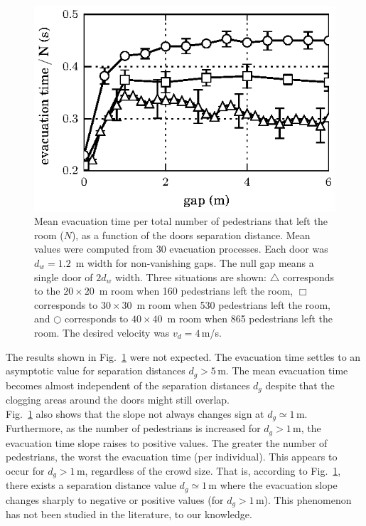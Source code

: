 \begin{figure}
\includegraphics[width=\columnwidth]{./fig9.eps}
\caption{\label{fig:1} Mean evacuation time per total number of pedestrians 
that left the room ($N$), as a function of the doors separation distance. Mean 
values were computed from 30 evacuation processes. Each door was $d_w=1.2$~m 
width for non-vanishing gaps. The null gap means a single door of $2d_w$ width. 
Three situations are shown: $\bigtriangleup$ corresponds to the $20\times20$~m 
room when 160 pedestrians left the room, $\Box$ corresponds to $30\times30$~m 
room when 530 pedestrians left the room, and $\bigcirc$ corresponds to 
$40\times40$~m room when  865 pedestrians left the room. The desired velocity 
was $v_d=4\,$m/s. }
\end{figure}

The results shown in Fig.~\ref{fig:1} were not expected. The evacuation time 
settles to an asymptotic value for separation distances $d_g>5\,$m. The mean 
evacuation time becomes almost independent of the separation distances $d_g$ 
despite that the clogging areas around the doors might still overlap. \\ 

Fig.~\ref{fig:1} also shows that the slope not always changes sign  
at $d_g\simeq1\,$m. Furthermore, as the number of pedestrians is increased for 
$d_g>1\,$m, the evacuation time slope raises to positive values. The 
greater the number of pedestrians, the worst the evacuation time (per 
individual). This appears to occur for $d_g>1\,$m, regardless of the crowd 
size. That is, according to Fig.~\ref{fig:1}, there exists a separation 
distance value $d_g\simeq1\,$m where the evacuation slope changes sharply 
to negative or positive values (for $d_g>1\,$m). This phenomenon has not been 
studied in the literature, to our knowledge. \\

